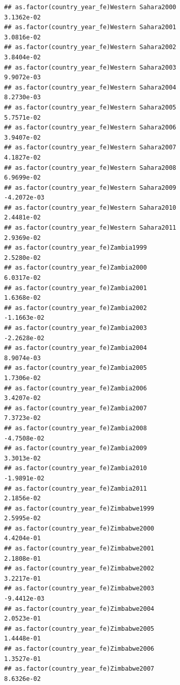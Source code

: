 \documentclass[
  a4paper,
]{article}
\begin{document}
\begin{verbatim}
## as.factor(country_year_fe)Western Sahara2000                    3.1362e-02
## as.factor(country_year_fe)Western Sahara2001                    3.0816e-02
## as.factor(country_year_fe)Western Sahara2002                    3.8404e-02
## as.factor(country_year_fe)Western Sahara2003                    9.9072e-03
## as.factor(country_year_fe)Western Sahara2004                    8.2730e-03
## as.factor(country_year_fe)Western Sahara2005                    5.7571e-02
## as.factor(country_year_fe)Western Sahara2006                    3.9407e-02
## as.factor(country_year_fe)Western Sahara2007                    4.1827e-02
## as.factor(country_year_fe)Western Sahara2008                    6.9699e-02
## as.factor(country_year_fe)Western Sahara2009                   -4.2072e-03
## as.factor(country_year_fe)Western Sahara2010                    2.4481e-02
## as.factor(country_year_fe)Western Sahara2011                    2.9369e-02
## as.factor(country_year_fe)Zambia1999                            2.5280e-02
## as.factor(country_year_fe)Zambia2000                            6.0317e-02
## as.factor(country_year_fe)Zambia2001                            1.6368e-02
## as.factor(country_year_fe)Zambia2002                           -1.1663e-02
## as.factor(country_year_fe)Zambia2003                           -2.2628e-02
## as.factor(country_year_fe)Zambia2004                            8.9074e-03
## as.factor(country_year_fe)Zambia2005                            1.7306e-02
## as.factor(country_year_fe)Zambia2006                            3.4207e-02
## as.factor(country_year_fe)Zambia2007                            7.3723e-02
## as.factor(country_year_fe)Zambia2008                           -4.7508e-02
## as.factor(country_year_fe)Zambia2009                            3.3013e-02
## as.factor(country_year_fe)Zambia2010                           -1.9891e-02
## as.factor(country_year_fe)Zambia2011                            2.1856e-02
## as.factor(country_year_fe)Zimbabwe1999                          2.5995e-02
## as.factor(country_year_fe)Zimbabwe2000                          4.4204e-01
## as.factor(country_year_fe)Zimbabwe2001                          2.1808e-01
## as.factor(country_year_fe)Zimbabwe2002                          3.2217e-01
## as.factor(country_year_fe)Zimbabwe2003                         -9.4412e-03
## as.factor(country_year_fe)Zimbabwe2004                          2.0523e-01
## as.factor(country_year_fe)Zimbabwe2005                          1.4448e-01
## as.factor(country_year_fe)Zimbabwe2006                          1.3527e-01
## as.factor(country_year_fe)Zimbabwe2007                          8.6326e-02

\end{verbatim}
\end{document}
